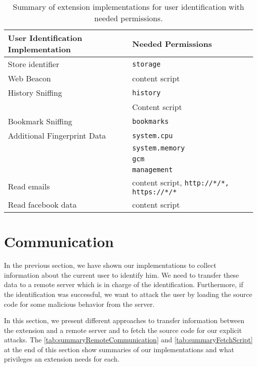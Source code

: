 	\begin{table}
		\centering
		\begin{tabular}{|l|l|} \hline 
			\textbf{User Identification Implementation} & \textbf{Needed Permissions} \\ \hline
			Store identifier & \texttt{storage} \\
			\hline
			Web Beacon & content script \\
			\hline
			History Sniffing & \texttt{history} \\
			& Content script \\
			Bookmark Sniffing & \texttt{bookmarks} \\
			\hline
			Additional Fingerprint Data & \texttt{system.cpu} \\
			& \texttt{system.memory} \\
			& \texttt{gcm} \\
			& \texttt{management} \\
			\hline
			Read emails & content script, \texttt{http://*/*, https://*/*} \\
			Read facebook data & content script \\
			\hline
		\end{tabular}
		\caption{Summary of extension implementations for user identification with needed permissions.}
		\label{tab:summaryUserIdentification}
	\end{table}

	
	
	
	
\clearpage
\section{Communication}
\label{sec:communication}

	In the previous section, we have shown our implementations to collect information about the current user to identify him. We need to transfer these data to a remote server which is in charge of the identification. Furthermore, if the identification was successful, we want to attack the user by loading the source code for some malicious behavior from the server.
	
	In this section, we present different approaches to transfer information between the extension and a remote server and to fetch the source code for our explicit attacks. The \autoref{tab:summaryRemoteCommunication} and \autoref{tab:summaryFetchScript} at the end of this section show summaries of our implementations and what privileges an extension needs for each.
	
